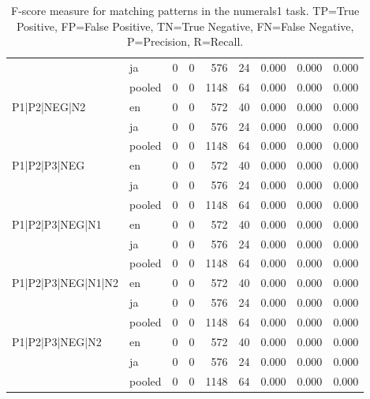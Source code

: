 \begin{table}[h!]
\begin{tabular}{llrrrrrrr}
 & ja & 0 & 0 & 576 & 24 & 0.000 & 0.000 & 0.000 \\
 & pooled & 0 & 0 & 1148 & 64 & 0.000 & 0.000 & 0.000 \\
\cline{1-9}
\multirow[t]{3}{*}{P1|P2|NEG|N2} & en & 0 & 0 & 572 & 40 & 0.000 & 0.000 & 0.000 \\
 & ja & 0 & 0 & 576 & 24 & 0.000 & 0.000 & 0.000 \\
 & pooled & 0 & 0 & 1148 & 64 & 0.000 & 0.000 & 0.000 \\
\cline{1-9}
\multirow[t]{3}{*}{P1|P2|P3|NEG} & en & 0 & 0 & 572 & 40 & 0.000 & 0.000 & 0.000 \\
 & ja & 0 & 0 & 576 & 24 & 0.000 & 0.000 & 0.000 \\
 & pooled & 0 & 0 & 1148 & 64 & 0.000 & 0.000 & 0.000 \\
\cline{1-9}
\multirow[t]{3}{*}{P1|P2|P3|NEG|N1} & en & 0 & 0 & 572 & 40 & 0.000 & 0.000 & 0.000 \\
 & ja & 0 & 0 & 576 & 24 & 0.000 & 0.000 & 0.000 \\
 & pooled & 0 & 0 & 1148 & 64 & 0.000 & 0.000 & 0.000 \\
\cline{1-9}
\multirow[t]{3}{*}{P1|P2|P3|NEG|N1|N2} & en & 0 & 0 & 572 & 40 & 0.000 & 0.000 & 0.000 \\
 & ja & 0 & 0 & 576 & 24 & 0.000 & 0.000 & 0.000 \\
 & pooled & 0 & 0 & 1148 & 64 & 0.000 & 0.000 & 0.000 \\
\cline{1-9}
\multirow[t]{3}{*}{P1|P2|P3|NEG|N2} & en & 0 & 0 & 572 & 40 & 0.000 & 0.000 & 0.000 \\
 & ja & 0 & 0 & 576 & 24 & 0.000 & 0.000 & 0.000 \\
 & pooled & 0 & 0 & 1148 & 64 & 0.000 & 0.000 & 0.000 \\
\cline{1-9}
\bottomrule
\end{tabular}
\caption{F-score measure for matching patterns in the numerals1 task. TP=True Positive, FP=False Positive, TN=True Negative, FN=False Negative, P=Precision, R=Recall.}
\label{tab:numerals1_f1}
\end{table}
